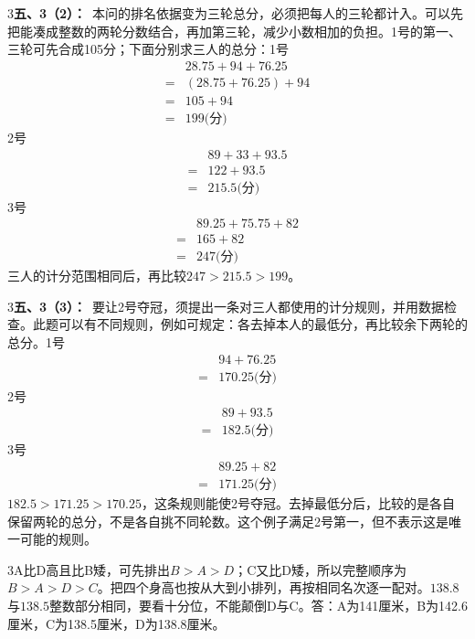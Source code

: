 \documentclass[multi=snippet,border={5bp 20bp 5bp 5bp}]{standalone}
\newenvironment{snippet}[3]{\begin{minipage}{#1bp}\color{answerred}\fontsize{#2}{#3}\selectfont\raggedright}{\end{minipage}}
\begin{document}
\begin{snippet}{505}{11.5}{14}\begin{multicols}{3}\raggedcolumns \textbf{五、3（2）：}\ 本问的排名依据变为三轮总分，必须把每人的三轮都计入。可以先把能凑成整数的两轮分数结合，再加第三轮，减少小数相加的负担。1号的第一、三轮可先合成105分；下面分别求三人的总分：1号\[\begin{aligned}&28.75+94+76.25\\={}&(28.75+76.25)+94\\={}&105+94\\={}&199\text{(分)}\end{aligned}\]2号\[\begin{aligned}&89+33+93.5\\={}&122+93.5\\={}&215.5\text{(分)}\end{aligned}\]3号\[\begin{aligned}&89.25+75.75+82\\={}&165+82\\={}&247\text{(分)}\end{aligned}\]三人的计分范围相同后，再比较\(247>215.5>199\)\allowbreak 。\end{multicols}\end{snippet}
\begin{snippet}{505}{11.5}{14}\begin{multicols}{3}\raggedcolumns \textbf{五、3（3）：}\ 要让2号夺冠，须提出一条对三人都使用的计分规则，并用数据检查。此题可以有不同规则，例如可规定：各去掉本人的最低分，再比较余下两轮的总分。1号\[\begin{aligned}&94+76.25\\={}&170.25\text{(分)}\end{aligned}\]2号\[\begin{aligned}&89+93.5\\={}&182.5\text{(分)}\end{aligned}\]3号\[\begin{aligned}&89.25+82\\={}&171.25\text{(分)}\end{aligned}\]\(182.5>171.25>170.25\)\allowbreak ，这条规则能使2号夺冠。去掉最低分后，比较的是各自保留两轮的总分，不是各自挑不同轮数。这个例子满足2号第一，但不表示这是唯一可能的规则。\end{multicols}\end{snippet}
\begin{snippet}{505}{11.5}{14}\begin{multicols}{3}\raggedcolumns A比D高且比B矮，可先排出\(B>A>D\)\allowbreak ；C又比D矮，所以完整顺序为\(B>A>D>C\)\allowbreak 。把四个身高也按从大到小排列，再按相同名次逐一配对。\(138.8\)\allowbreak 与\(138.5\)\allowbreak 整数部分相同，要看十分位，不能颠倒D与C。答：A为141厘米，B为142.6厘米，C为138.5厘米，D为138.8厘米。\end{multicols}\end{snippet}
\end{document}

